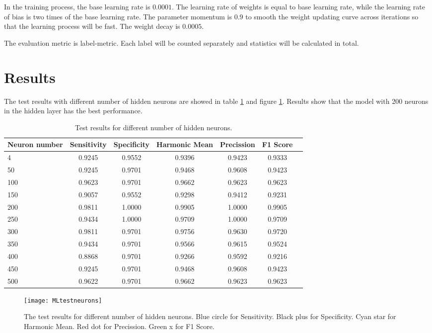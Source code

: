 In the training process, the base learning rate is $0.0001$. The learning rate of weights is equal to base learning rate, while the learning rate of bias is two times of the base learning rate. The parameter momentum is $0.9$ to smooth the weight updating curve across iterations so that the learning process will be fast. The weight decay is $0.0005$.

The evaluation metric is label-metric. Each label will be counted separately and statistics will be calculated in total.

\section{Results}

The test results with different number of hidden neurons are showed in table \ref{tb:tMLtestneurons} and figure \ref{fig:MLtestneurons}. Results show that the model with 200 neurons in the hidden layer has the best performance.
\begin{table}
\centering
\begin{tabular}{l*{6}{c}}
Neuron number              & Sensitivity & Specificity & Harmonic Mean & Precission & F1 Score  \\
\hline
4 				& 0.9245 & 0.9552 & 0.9396 & 0.9423 & 0.9333   \\
50              & 0.9245 & 0.9701 & 0.9468 & 0.9608 & 0.9423   \\
100             & 0.9623 & 0.9701 & 0.9662 & 0.9623 &  0.9623  \\
150             & 0.9057 & 0.9552 & 0.9298 & 0.9412 &  0.9231   \\
200             & 0.9811 & 1.0000 & 0.9905 & 1.0000 &  0.9905   \\
250             & 0.9434 & 1.0000 & 0.9709 & 1.0000 &  0.9709   \\
300             & 0.9811 & 0.9701 & 0.9756 & 0.9630 &  0.9720   \\
350             & 0.9434 & 0.9701 & 0.9566 & 0.9615 &  0.9524   \\
400             & 0.8868 & 0.9701 & 0.9266 & 0.9592 &  0.9216   \\
450             & 0.9245 & 0.9701 & 0.9468 & 0.9608 &  0.9423   \\
500             & 0.9622 & 0.9701 & 0.9662 & 0.9623 &  0.9623   \\
\end{tabular}
\caption{\label{tb:tMLtestneurons}Test results for different number of hidden neurons.}
\end{table}
\begin{figure}[htb]
\centering
\texttt{[image: MLtestneurons]}
\caption{\label{fig:MLtestneurons}The test results for different number of hidden neurons. Blue circle for Sensitivity. Black plus for Specificity. Cyan star for Harmonic Mean. Red dot for Precission. Green x for F1 Score.}
\end{figure}


